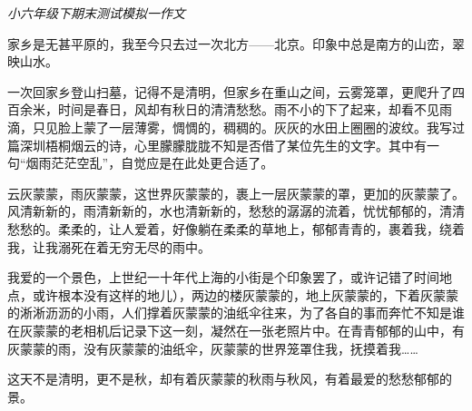 \documentclass{ctexart}
\begin{document}
\textit{小六年级下期末测试模拟一作文}

家乡是无甚平原的，我至今只去过一次北方——北京。印象中总是南方的山峦，翠映山水。

一次回家乡登山扫墓，记得不是清明，但家乡在重山之间，云雾笼罩，更爬升了四百余米，时间是春日，风却有秋日的清清愁愁。雨不小的下了起来，却看不见雨滴，只见脸上蒙了一层薄雾，惆惆的，稠稠的。灰灰的水田上圈圈的波纹。我写过篇深圳梧桐烟云的诗，心里朦朦胧胧不知是否借了某位先生的文字。其中有一句“烟雨茫茫空乱”，自觉应是在此处更合适了。

云灰蒙蒙，雨灰蒙蒙，这世界灰蒙蒙的，裹上一层灰蒙蒙的罩，更加的灰蒙蒙了。风清新新的，雨清新新的，水也清新新的，愁愁的潺潺的流着，忧忧郁郁的，清清愁愁的。柔柔的，让人爱着，好像躺在柔柔的草地上，郁郁青青的，裹着我，绕着我，让我溺死在着无穷无尽的雨中。

我爱的一个景色，上世纪一十年代上海的小街是个印象罢了，或许记错了时间地点，或许根本没有这样的地儿），两边的楼灰蒙蒙的，地上灰蒙蒙的，下着灰蒙蒙的淅淅沥沥的小雨，人们撑着灰蒙蒙的油纸伞往来，为了各自的事而奔忙不知是谁在灰蒙蒙的老相机后记录下这一刻，凝然在一张老照片中。在青青郁郁的山中，有灰蒙蒙的雨，没有灰蒙蒙的油纸伞，灰蒙蒙的世界笼罩住我，抚摸着我……

这天不是清明，更不是秋，却有着灰蒙蒙的秋雨与秋风，有着最爱的愁愁郁郁的景。
\end{document}
